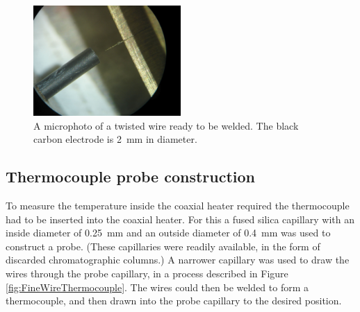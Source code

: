 \begin{figure}
	\centering
	\includegraphics[width=0.5\textwidth]{Figures/WelderMicro.jpg}
	\decoRule
	
\caption[A microphoto of a thermocouple twist ready to be welded.]{A microphoto
of a twisted wire ready to be welded. The black carbon electrode is
\SI{2}{\milli\metre} in diameter.}
	
	\label{fig:TCWeldMicro}
\end{figure}

\subsection{Thermocouple probe construction}

To measure the temperature inside the coaxial heater required the thermocouple
had to be inserted into the coaxial heater. For this a fused silica capillary
with an inside diameter of \SI{0.25}{\milli\metre} and an outside diameter of
\SI{0.4}{\milli\metre} was used to construct a probe. (These capillaries were
readily available, in the form of discarded chromatographic columns.) A narrower
capillary was used to draw the wires through the probe capillary, in a process
described in Figure \ref{fig:FineWireThermocouple}. The wires could then be
welded to form a thermocouple, and then drawn into the probe capillary to the
desired position.

